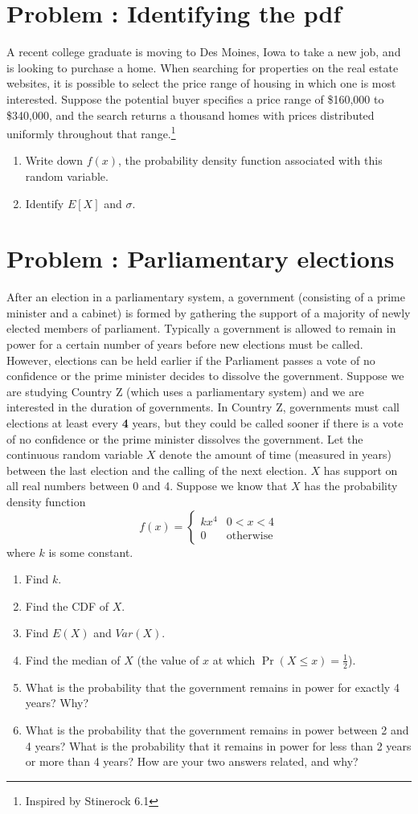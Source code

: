 \documentclass[11pt]{article}
\newcounter{problem}
\newcommand{\problem}[1]{\stepcounter{problem}\section*{Problem \theproblem: #1}}
\begin{document}
\problem{Identifying the pdf}

A recent college graduate is moving to Des Moines, Iowa to take a new
job, and is looking to purchase a home. When searching for properties
on the real estate websites, it is possible to select the price range
of housing in which one is most interested. Suppose the potential
buyer specifies a price range of \$160,000 to \$340,000, and the
search returns a thousand homes with prices distributed uniformly
throughout that range.\footnote{Inspired by Stinerock 6.1}

\begin{enumerate}[label=\alph*.]
\item Write down $f(x)$, the probability density function associated
  with this random variable.
\item Identify $E[X]$ and $\sigma$.
\end{enumerate}

\problem{Parliamentary elections}

After an election in a parliamentary system, a government (consisting
of a prime minister and a cabinet) is formed by gathering the support
of a majority of newly elected members of parliament. Typically a
government is allowed to remain in power for a certain number of years
before new elections must be called. However, elections can be held
earlier if the Parliament passes a vote of no confidence or the prime
minister decides to dissolve the government. Suppose we are studying
Country Z (which uses a parliamentary system) and we are interested in
the duration of governments. In Country Z, governments must call
elections at least every \textbf{4} years, but they could be called
sooner if there is a vote of no confidence or the prime minister
dissolves the government. Let the continuous random variable $X$
denote the amount of time (measured in years) between the last
election and the calling of the next election. $X$ has support on
all real numbers between 0 and 4. Suppose we know that $X$ has the
probability density function
$$
f(x) = \begin{cases}
kx^4 &  0 < x < 4 \\
0 & \text{otherwise}
\end{cases}
$$
where $k$ is some constant.


\begin{enumerate}[label=\alph*.]
\item Find $k$.
\item Find the CDF of $X$.
\item Find $E(X)$ and $Var(X)$.
\item Find the median of $X$ (the value of $x$ at which
  $\Pr(X \leq x) = \frac{1}{2}$).
\item What is the probability that the government remains in power for
  exactly 4 years? Why?
\item What is the probability that the government remains in power
  between 2 and 4 years? What is the probability that it remains in
  power for less than 2 years or more than 4 years? How are your two
  answers related, and why?
\end{enumerate}
\end{document}
